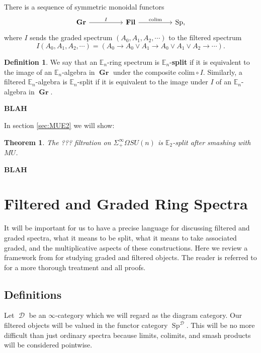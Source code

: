 \documentclass[reqno, oneside]{amsart}
\theoremstyle{definition}
\newtheorem{dfn}[nul]{Definition}
\theoremstyle{plain}
\newtheorem{thm}[nul]{Theorem}
\DeclareMathOperator{\C}{\mathcal{C}}
\DeclareMathOperator{\D}{\mathcal{D}}
\DeclareMathOperator{\Gr}{\textbf{Gr}}
\DeclareMathOperator{\Fil}{\textbf{Fil}}
\DeclareMathOperator{\Sp}{\text{Sp}}
\begin{document}
There is a sequence of symmetric monoidal functors
$$
\begin{tikzcd}[column sep=huge]
\Gr \arrow{r}{I} & \Fil \arrow{r}{\text{colim}} & \Sp,
\end{tikzcd}
$$
where $I$ sends the graded spectrum $(A_0,A_1,A_2,\cdots)$ to the filtered spectrum
$$
I(A_0,A_1,A_2,\cdots) = \left( A_0 \longrightarrow A_0 \vee A_1 \longrightarrow A_0 \vee A_1 \vee A_2 \longrightarrow \cdots\right).
$$

\begin{dfn}
We say that an $\mathbb{E}_n$-ring spectrum is $\mathbb{E}_n$-\textbf{split} if it is equivalent to the image of an $\mathbb{E}_n$-algebra in $\Gr$ under the composite $\text{colim} \circ I.$  Similarly, a filtered $\mathbb{E}_n$-algebra is $\mathbb{E}_n$-split if it is equivalent to the image under $I$ of an $\mathbb{E}_n$-algebra in $\Gr$.
\end{dfn}

\textbf{BLAH}

In section \ref{sec:MUE2} we will show:
\begin{thm}
The ??? filtration on $\Sigma^{\infty}_+ \Omega SU(n)$ is $\mathbb{E}_2$-split after smashing with $MU$.
\end{thm}

\textbf{BLAH}


\section{Filtered and Graded Ring Spectra} \label{sec:FilGra}

It will be important for us to have a precise language for discussing filtered and graded spectra, what it means to be split, what it means to take associated graded, and the multiplicative aspects of these constructions. Here we review a framework from \cite{LurieRot} for studying graded and filtered objects.  The reader is referred to \cite{LurieRot} for a more thorough treatment and all proofs.  

\subsection{Definitions}

Let $\D$ be an $\infty$-category which we will regard as the diagram category.  Our filtered objects will be valued in the functor category $\Sp^{\D}.$  This will be no more difficult than just ordinary spectra because limits, colimits, and smash products will be considered pointwise.  
\end{document}
